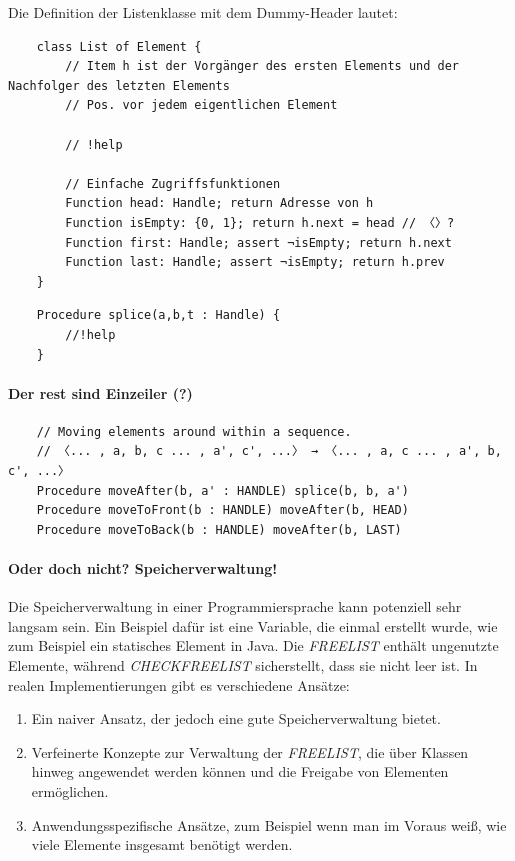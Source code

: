 Die Definition der Listenklasse mit dem Dummy-Header lautet:

\begin{verbatim}
    class List of Element {
        // Item h ist der Vorgänger des ersten Elements und der Nachfolger des letzten Elements
        // Pos. vor jedem eigentlichen Element

        // !help
    
        // Einfache Zugriffsfunktionen
        Function head: Handle; return Adresse von h
        Function isEmpty: {0, 1}; return h.next = head // 〈〉?
        Function first: Handle; assert ¬isEmpty; return h.next
        Function last: Handle; assert ¬isEmpty; return h.prev
    }
\end{verbatim}
\begin{verbatim}
    Procedure splice(a,b,t : Handle) {
        //!help
    }
\end{verbatim}

\paragraph{Der rest sind Einzeiler (?)}

\begin{verbatim}
    // Moving elements around within a sequence.
    // 〈... , a, b, c ... , a', c', ...〉 → 〈... , a, c ... , a', b, c', ...〉
    Procedure moveAfter(b, a' : HANDLE) splice(b, b, a')
    Procedure moveToFront(b : HANDLE) moveAfter(b, HEAD)
    Procedure moveToBack(b : HANDLE) moveAfter(b, LAST)
\end{verbatim}

\paragraph{Oder doch nicht? Speicherverwaltung!}
Die Speicherverwaltung in einer Programmiersprache kann potenziell sehr langsam sein. Ein Beispiel dafür ist eine Variable, die einmal erstellt wurde, wie zum Beispiel ein statisches Element in Java.
Die \textit{FREELIST} enthält ungenutzte Elemente, während \textit{CHECKFREELIST} sicherstellt, dass sie nicht leer ist.
In realen Implementierungen gibt es verschiedene Ansätze:
\begin{enumerate}
\item Ein naiver Ansatz, der jedoch eine gute Speicherverwaltung bietet.
\item Verfeinerte Konzepte zur Verwaltung der \textit{FREELIST}, die über Klassen hinweg angewendet werden können und die Freigabe von Elementen ermöglichen.
\item Anwendungsspezifische Ansätze, zum Beispiel wenn man im Voraus weiß, wie viele Elemente insgesamt benötigt werden.
\end{enumerate}

